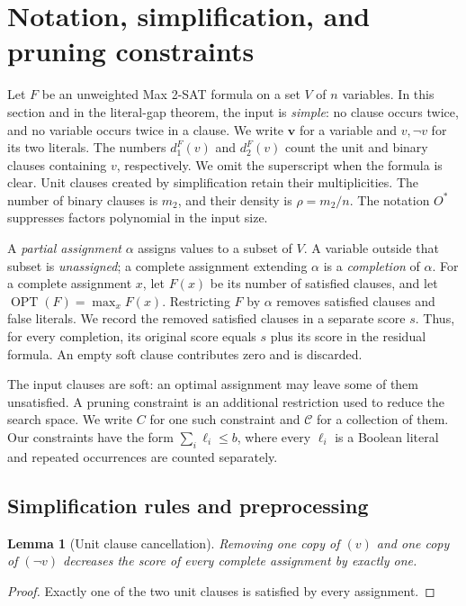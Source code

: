 \documentclass[11pt,a4paper]{article}
\newtheorem{lemma}[theorem]{Lemma}
\theoremstyle{definition}
\theoremstyle{remark}
\newcommand{\Ostar}{O^{*}}
\newcommand{\OPT}{\operatorname{OPT}}
\begin{document}
\section{Notation, simplification, and pruning constraints}\label{sec:framework}

Let $F$ be an unweighted Max 2-SAT formula on a set $V$ of $n$ variables.
In this section and in the literal-gap theorem, the input is \emph{simple}:
no clause occurs twice, and no variable occurs twice in a clause.
We write $\mathbf v$ for a variable and $v,\neg v$ for its two literals.
The numbers $d_1^F(v)$ and $d_2^F(v)$ count the unit and binary clauses
containing $v$, respectively. We omit the superscript when the formula is
clear. Unit clauses created by simplification retain their multiplicities.
The number of binary clauses is $m_2$, and their density is $\rho=m_2/n$.
The notation $\Ostar$ suppresses factors polynomial in the input size.

A \emph{partial assignment} $\alpha$ assigns values to a subset of $V$.
A variable outside that subset is \emph{unassigned}; a complete assignment
extending $\alpha$ is a \emph{completion} of $\alpha$.
For a complete assignment $x$, let $F(x)$ be its number of satisfied clauses,
and let $\OPT(F)=\max_x F(x)$.
Restricting $F$ by $\alpha$ removes satisfied clauses and false literals.
We record the removed satisfied clauses in a separate score $s$.
Thus, for every completion, its original score equals $s$ plus its score in
the residual formula. An empty soft clause contributes zero and is discarded.

The input clauses are soft: an optimal assignment may leave some of them
unsatisfied. A pruning constraint is an additional restriction used to
reduce the search space. We write $C$ for one such constraint and
$\mathcal C$ for a collection of them. Our constraints have the form
$\sum_i\ell_i\le b$, where every $\ell_i$ is a Boolean literal and repeated
occurrences are counted separately.

\subsection{Simplification rules and preprocessing}

\begin{lemma}[Unit clause cancellation]\label{lem:unit_canc}
Removing one copy of $(v)$ and one copy of $(\neg v)$ decreases the score
of every complete assignment by exactly one.
\end{lemma}
\begin{proof}
Exactly one of the two unit clauses is satisfied by every assignment.
\end{proof}
\end{document}
